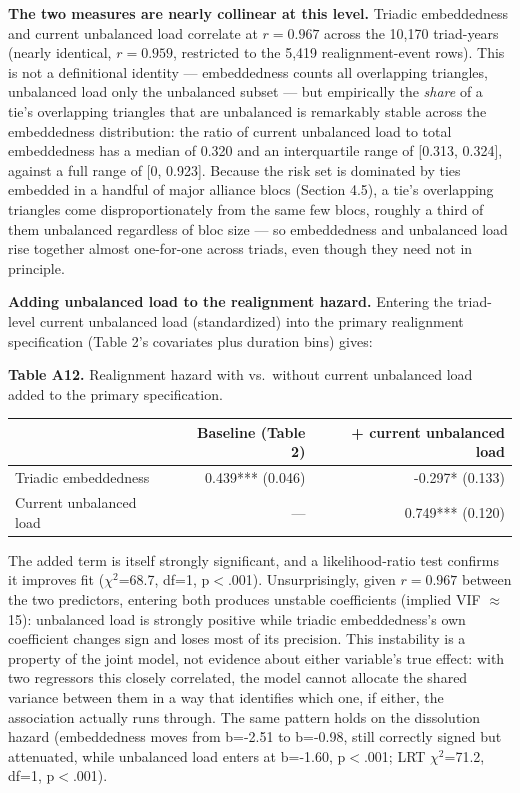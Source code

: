 \documentclass[Afour,sageh,times,doublespace]{sagej}
\begin{document}
\textbf{The two measures are nearly collinear at this level.} Triadic embeddedness and current unbalanced load correlate at $r=0.967$ across the 10,170 triad-years (nearly identical, $r=0.959$, restricted to the 5,419 realignment-event rows). This is not a definitional identity --- embeddedness counts all overlapping triangles, unbalanced load only the unbalanced subset --- but empirically the \emph{share} of a tie's overlapping triangles that are unbalanced is remarkably stable across the embeddedness distribution: the ratio of current unbalanced load to total embeddedness has a median of 0.320 and an interquartile range of [0.313, 0.324], against a full range of [0, 0.923]. Because the risk set is dominated by ties embedded in a handful of major alliance blocs (Section 4.5), a tie's overlapping triangles come disproportionately from the same few blocs, roughly a third of them unbalanced regardless of bloc size --- so embeddedness and unbalanced load rise together almost one-for-one across triads, even though they need not in principle.

\textbf{Adding unbalanced load to the realignment hazard.} Entering the triad-level current unbalanced load (standardized) into the primary realignment specification (Table 2's covariates plus duration bins) gives:

\begin{table}[t]
\centering
\textbf{Table A12.} Realignment hazard with vs.\ without current unbalanced load added to the primary specification.

\vspace{4pt}
{\small\sf
\begin{tabular}{lrr}
\toprule
 & Baseline (Table 2) & + current unbalanced load \\
\midrule
Triadic embeddedness & 0.439*** (0.046) & -0.297* (0.133) \\
Current unbalanced load & --- & 0.749*** (0.120) \\
\bottomrule
\end{tabular}
\par}
\end{table}

The added term is itself strongly significant, and a likelihood-ratio test confirms it improves fit ($\chi^2$=68.7, df=1, p$<$.001). Unsurprisingly, given $r=0.967$ between the two predictors, entering both produces unstable coefficients (implied VIF $\approx$15): unbalanced load is strongly positive while triadic embeddedness's own coefficient changes sign and loses most of its precision. This instability is a property of the joint model, not evidence about either variable's true effect: with two regressors this closely correlated, the model cannot allocate the shared variance between them in a way that identifies which one, if either, the association actually runs through. The same pattern holds on the dissolution hazard (embeddedness moves from b=-2.51 to b=-0.98, still correctly signed but attenuated, while unbalanced load enters at b=-1.60, p$<$.001; LRT $\chi^2$=71.2, df=1, p$<$.001).
\end{document}

